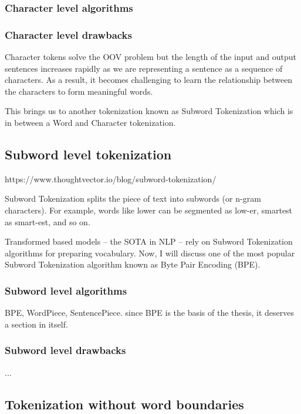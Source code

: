 \subsubsection{Character level algorithms}

\subsubsection{Character level drawbacks}

Character tokens solve the OOV problem but the length of the input and output sentences increases rapidly as we are representing a sentence as a sequence of characters. As a result, it becomes challenging to learn the relationship between the characters to form meaningful words.

This brings us to another tokenization known as Subword Tokenization which is in between a Word and Character tokenization.

\subsection{Subword level tokenization}

https://www.thoughtvector.io/blog/subword-tokenization/

Subword Tokenization splits the piece of text into subwords (or n-gram characters). For example, words like lower can be segmented as low-er, smartest as smart-est, and so on.

Transformed based models – the SOTA in NLP – rely on Subword Tokenization algorithms for preparing vocabulary. Now, I will discuss one of the most popular Subword Tokenization algorithm known as Byte Pair Encoding (BPE).

\subsubsection{Subword level algorithms}

BPE, WordPiece, SentencePiece. since BPE is the basis of the thesis, it deserves a section in itself.

\subsubsection{Subword level drawbacks}

...


\subsection{Tokenization without word boundaries}\label{subsec:wordtokwowb}

